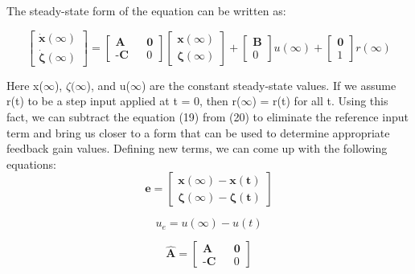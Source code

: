 \documentclass[titlepage]{article}
\begin{document}
The steady-state form of the equation can be written as:

\begin{equation}
\begin{bmatrix}
\mathbf{\dot x(\infty)} \\
\boldsymbol{\dot \zeta(\infty)}
\end{bmatrix}
=
\begin{bmatrix}
\textbf{A} && \textbf{0} \\
\textbf{-C} && 0
\end{bmatrix}
\begin{bmatrix}
\boldsymbol{x(\infty)} \\
\boldsymbol{\zeta(\infty)}
\end{bmatrix}
+
\begin{bmatrix}
\textbf{B} \\ 0
\end{bmatrix}
u(\infty)
+
\begin{bmatrix}
\textbf{0} \\ 1
\end{bmatrix}
r(\infty)
\end{equation}

Here x($\infty$), $\zeta(\infty$), and u($\infty$) are the constant steady-state values. If we assume r(t) to be a step input applied at t = 0, then r($\infty$) = r(t) for all t. Using this fact, we can subtract the equation (19) from (20) to eliminate the reference input term and bring us closer to a form that can be used to determine appropriate feedback gain values. Defining new terms, we can come up with the following equations:
\begin{equation}
   \textbf{e} = 
   \begin{bmatrix}
       \mathbf{x(\infty) - x(t)} \\ \boldsymbol{\zeta(\infty)-\zeta(t)}
   \end{bmatrix}   
\end{equation}

\begin{equation}
   u_{e} = u(\infty) - u(t)
\end{equation}

\begin{equation}
    \mathbf{\hat{A}} = 
    \begin{bmatrix}
        \textbf{A} && \textbf{0}\\
        \textbf{-C} && 0
    \end{bmatrix}
\end{equation}
\end{document}
